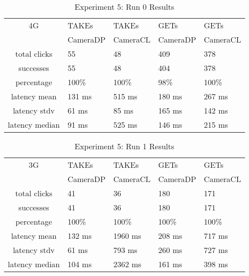 \begin{table}[htb]
\begin{scriptsize} 
\caption{Experiment 5: Run 0 Results} 
\label{table:exp-5-run0-results}
 \begin{center}
 \begin{tabular}{| c | p{1.5cm} | p{1.5cm} | p{1.5cm} | p{1.4cm} |}
  \hline
  4G & TAKEs & TAKEs & GETs & GETs \\
  & CameraDP & CameraCL & CameraDP & CameraCL \\
  \hline
  total clicks & 55 & 48 & 409 & 378 \\
  \hline
  successes & 55 & 48 & 404 & 378 \\
  \hline
  percentage & 100\% & 100\% & 98\% & 100\% \\
  \hline
  latency mean & 131 ms & 515 ms & 180 ms & 267 ms \\
  \hline
  latency stdv & 61 ms & 85 ms & 165 ms & 142 ms \\
  \hline
  latency median & 91 ms & 525 ms & 146 ms & 215 ms \\
  \hline
  \end{tabular}

  \end{center}
\end{scriptsize}
\end{table}
\begin{table}[htb]
\begin{scriptsize} 
\caption{Experiment 5: Run 1 Results} 
\label{table:exp-5-run1-results}
 \begin{center}
 \begin{tabular}{| c | p{1.5cm} | p{1.5cm} | p{1.5cm} | p{1.4cm} |}
  \hline
  3G & TAKEs & TAKEs & GETs & GETs \\
  & CameraDP & CameraCL & CameraDP & CameraCL \\
  \hline
  total clicks & 41 & 36 & 180 &  171 \\
  \hline
  successes & 41 & 36 & 180 & 171 \\
  \hline
  percentage & 100\% & 100\% & 100\% & 100\% \\
  \hline
  latency mean & 132 ms & 1960 ms & 208 ms & 717 ms \\
  \hline
  latency stdv & 61 ms & 793 ms & 260 ms & 727 ms \\
  \hline
  latency median & 104 ms & 2362 ms & 161 ms & 398 ms \\
  \hline
  \end{tabular}
  \end{center}
\end{scriptsize}
\end{table}

